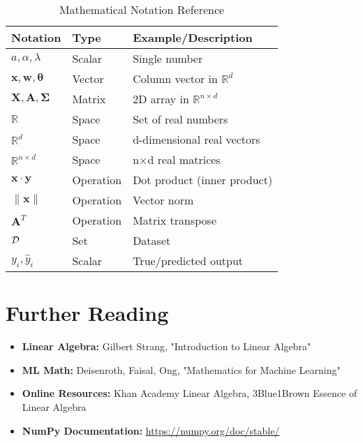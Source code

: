 \documentclass{article}
\providecommand{\vx}{\mathbf{x}}
\providecommand{\vy}{\mathbf{y}}
\providecommand{\vw}{\mathbf{w}}
\providecommand{\vtheta}{\boldsymbol{\theta}}
\providecommand{\mX}{\mathbf{X}}
\providecommand{\mA}{\mathbf{A}}
\providecommand{\mSigma}{\boldsymbol{\Sigma}}
\providecommand{\Real}{\mathbb{R}}
\begin{document}
\begin{table}[h]
\centering
\begin{tabular}{|l|l|l|}
\hline
\textbf{Notation} & \textbf{Type} & \textbf{Example/Description} \\
\hline
$a, \alpha, \lambda$ & Scalar & Single number \\
$\vx, \vw, \vtheta$ & Vector & Column vector in $\Real^d$ \\
$\mX, \mA, \mSigma$ & Matrix & 2D array in $\Real^{n \times d}$ \\
$\Real$ & Space & Set of real numbers \\
$\Real^d$ & Space & d-dimensional real vectors \\
$\Real^{n \times d}$ & Space & n×d real matrices \\
$\vx \cdot \vy$ & Operation & Dot product (inner product) \\
$\|\vx\|$ & Operation & Vector norm \\
$\mA^T$ & Operation & Matrix transpose \\
$\mathcal{D}$ & Set & Dataset \\
$y_i, \hat{y}_i$ & Scalar & True/predicted output \\
\hline
\end{tabular}
\caption{Mathematical Notation Reference}
\end{table}

\section{Further Reading}

\begin{itemize}
    \item \textbf{Linear Algebra:} Gilbert Strang, "Introduction to Linear Algebra"
    \item \textbf{ML Math:} Deisenroth, Faisal, Ong, "Mathematics for Machine Learning" 
    \item \textbf{Online Resources:} Khan Academy Linear Algebra, 3Blue1Brown Essence of Linear Algebra
    \item \textbf{NumPy Documentation:} \url{https://numpy.org/doc/stable/}
\end{itemize}
\end{document}
